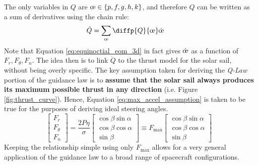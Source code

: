 The only variables in $Q$ are $\moe \in \{p, f, g, h, k\}$, and therefore $Q$ can be written as a sum of derivatives using the chain rule:
\begin{align*}
    \dot{Q} & = \sum_{\moe} \diffp{Q}{{\moe}} \dot{\moe}
\end{align*}
Note that Equation \ref{eq:equinoctial_eom_3d} in fact gives $\dot{\moe}$ as a function of $F_r, F_\theta, F_n$. The idea then is to link $\dot{Q}$ to the thrust model for the solar sail, without being overly specific. The key assumption taken for deriving the \textit{Q-Law} portion of the guidance law is to \textbf{assume that the solar sail always produces its maximum possible thrust in any direction} (i.e. Figure \ref{fig:thrust_curve}). Hence, Equation \ref{eq:max_accel_assumption} is taken to be true for the purposes of deriving ideal steering angles.
\begin{equation}
    \begin{bmatrix}
        F_r      \\
        F_\theta \\
        F_n
    \end{bmatrix} =
    \frac{2P\eta}{\sigma}
    \begin{bmatrix}
        \cos \beta \sin \alpha \\
        \cos \beta \cos \alpha \\
        \sin \beta
    \end{bmatrix}
    \equiv
    F_{\max}
    \begin{bmatrix}
        \cos \beta \sin \alpha \\
        \cos \beta \cos \alpha \\
        \sin \beta
    \end{bmatrix}
    \label{eq:max_accel_assumption}
\end{equation}
Keeping the relationship simple using only $F_{\max}$ allows for a very general application of the guidance law to a broad range of spacecraft configurations.

